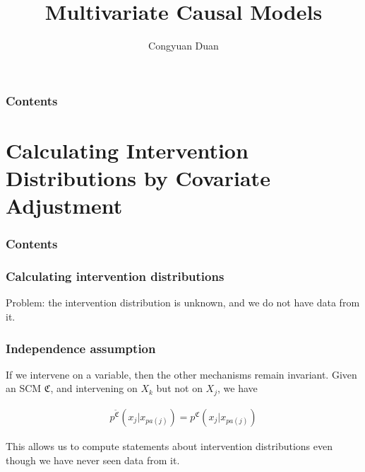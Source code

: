 \documentclass{beamer}
\title{Multivariate Causal Models}
\author{Congyuan Duan}
\begin{document}
\frame{\titlepage}

\begin{frame}
    \frametitle{Contents}
    \tableofcontents
\end{frame}

\section{Calculating Intervention Distributions by Covariate Adjustment}

\begin{frame}
    \frametitle{Contents}
    \tableofcontents[currentsection]
\end{frame}

\begin{frame}
    \frametitle{Calculating intervention distributions}
    \begin{flushleft}
        Problem: the intervention distribution is unknown, and we do not have data from it.  
    \end{flushleft} 
\end{frame}

\begin{frame}
    \frametitle{Independence assumption}
    \begin{flushleft}
        If we intervene on a variable, then the other mechanisms remain invariant.  Given an SCM $\mathfrak{C}$, and 
        intervening on $X_k$ but not on $X_j$, we have
    \end{flushleft} 
    \begin{align*}
        p^{\widetilde{\mathfrak{C}}}(x_j|x_{pa(j)})=p^{\mathfrak{C}}(x_j|x_{pa(j)})
    \end{align*}
    \begin{flushleft}
        This allows us to compute statements about intervention distributions even though we have never seen data from it.
    \end{flushleft}
\end{frame}
\end{document}
